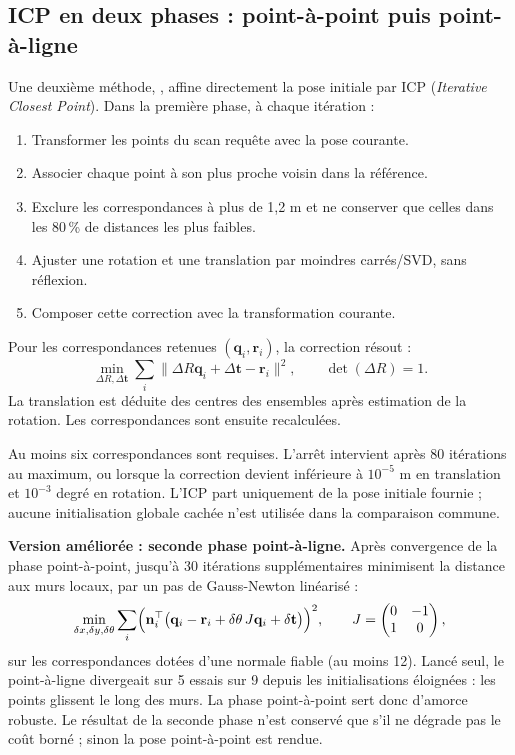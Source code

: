 \documentclass[11pt,a4paper]{article}
\newcommand{\code}[1]{\texttt{\detokenize{#1}}}
\begin{document}
\subsection{ICP en deux phases : point-à-point puis point-à-ligne}
Une deuxième méthode, \code{ICPMatcher}, affine directement la pose initiale
par ICP (\emph{Iterative Closest Point}). Dans la première phase, à chaque itération :
\begin{enumerate}[nosep]
\item Transformer les points du scan requête avec la pose courante.
\item Associer chaque point à son plus proche voisin dans la référence.
\item Exclure les correspondances à plus de 1,2 m et ne conserver que celles
dans les 80\,\% de distances les plus faibles.
\item Ajuster une rotation et une translation par moindres carrés/SVD,
sans réflexion.
\item Composer cette correction avec la transformation courante.
\end{enumerate}

Pour les correspondances retenues $(\mathbf q_i,\mathbf r_i)$, la correction
résout :
\[
 \min_{\Delta R,\Delta\mathbf t}
 \sum_i\|\Delta R\mathbf q_i+\Delta\mathbf t-\mathbf r_i\|^2,
 \qquad \det(\Delta R)=1.
\]
La translation est déduite des centres des ensembles après estimation
de la rotation. Les correspondances sont ensuite recalculées.

Au moins six correspondances sont requises. L'arrêt intervient après
80 itérations au maximum, ou lorsque la correction devient inférieure
à $10^{-5}$ m en translation et $10^{-3}$ degré en rotation.
L'ICP part uniquement de la pose initiale fournie ; aucune initialisation
globale cachée n'est utilisée dans la comparaison commune.

\textbf{Version améliorée : seconde phase point-à-ligne.} Après convergence
de la phase point-à-point, jusqu'à 30 itérations supplémentaires minimisent
la distance aux murs locaux, par un pas de Gauss-Newton linéarisé :
\[
 \min_{\delta x,\delta y,\delta\theta}\sum_i
 \Bigl(\mathbf n_i^{\top}\bigl(\mathbf q_i-\mathbf r_i
 +\delta\theta\,J\mathbf q_i+\delta\mathbf t\bigr)\Bigr)^2,
 \qquad J=\begin{pmatrix}0&-1\\1&0\end{pmatrix},
\]
sur les correspondances dotées d'une normale fiable (au moins 12).
Lancé seul, le point-à-ligne divergeait sur 5 essais sur 9 depuis les
initialisations éloignées : les points glissent le long des murs.
La phase point-à-point sert donc d'amorce robuste. Le résultat de la seconde
phase n'est conservé que s'il ne dégrade pas le coût borné ; sinon la pose
point-à-point est rendue.
\end{document}
